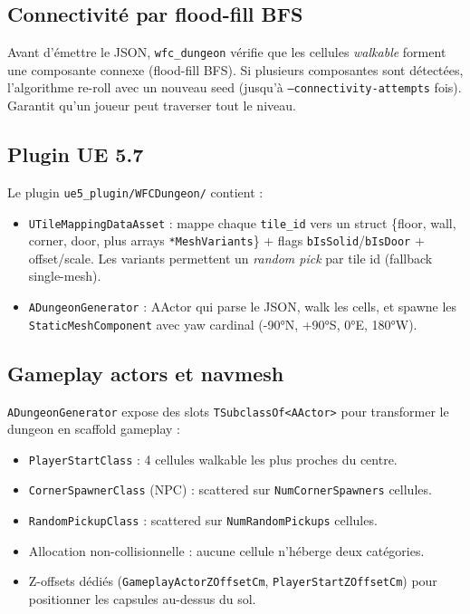 \subsection{Connectivité par flood-fill BFS}

Avant d'émettre le JSON, \texttt{wfc\_dungeon} vérifie que les cellules
\textit{walkable} forment une composante connexe (flood-fill BFS). Si
plusieurs composantes sont détectées, l'algorithme re-roll avec un
nouveau seed (jusqu'à \texttt{--connectivity-attempts} fois). Garantit
qu'un joueur peut traverser tout le niveau.

\subsection{Plugin UE 5.7}

Le plugin \texttt{ue5\_plugin/WFCDungeon/} contient :

\begin{itemize}
    \item \texttt{UTileMappingDataAsset} : mappe chaque \texttt{tile\_id} vers un struct \{floor, wall, corner, door, plus arrays \texttt{*MeshVariants}\} + flags \texttt{bIsSolid}/\texttt{bIsDoor} + offset/scale. Les variants permettent un \textit{random pick} par tile id (fallback single-mesh).
    \item \texttt{ADungeonGenerator} : AActor qui parse le JSON, walk les cells, et spawne les \texttt{StaticMeshComponent} avec yaw cardinal (-90°N, +90°S, 0°E, 180°W).
\end{itemize}

\subsection{Gameplay actors et navmesh}

\texttt{ADungeonGenerator} expose des slots \texttt{TSubclassOf<AActor>}
pour transformer le dungeon en scaffold gameplay :

\begin{itemize}
    \item \texttt{PlayerStartClass} : 4 cellules walkable les plus proches du centre.
    \item \texttt{CornerSpawnerClass} (NPC) : scattered sur \texttt{NumCornerSpawners} cellules.
    \item \texttt{RandomPickupClass} : scattered sur \texttt{NumRandomPickups} cellules.
    \item Allocation non-collisionnelle : aucune cellule n'héberge deux catégories.
    \item Z-offsets dédiés (\texttt{GameplayActorZOffsetCm}, \texttt{PlayerStartZOffsetCm}) pour positionner les capsules au-dessus du sol.
\end{itemize}


